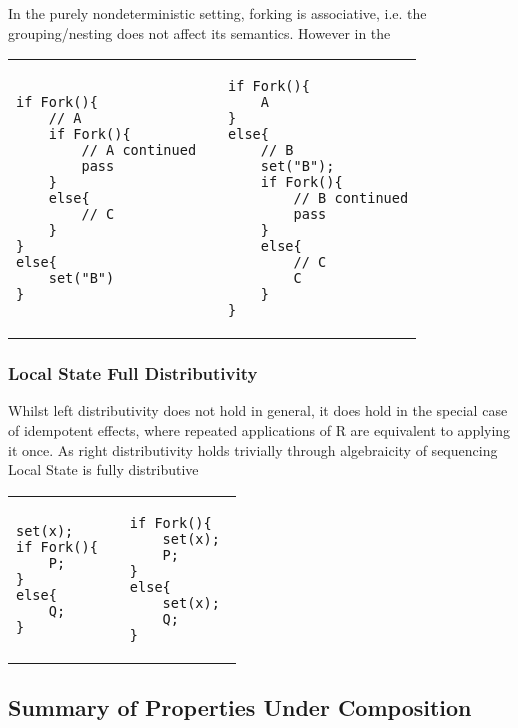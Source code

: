 \documentclass[logo,bsc,singlespacing,parskip]{infthesis}
\begin{document}
In the purely nondeterministic setting, forking is associative, i.e. the grouping/nesting does not affect its semantics. However in the 

\begin{table}[H]
\centering
\begin{tabular}{p{} c p{}}
\begin{lstlisting}
if Fork(){
    // A
    if Fork(){
        // A continued
        pass
    }
    else{
        // C
    }
}
else{
    set("B")
}
\end{lstlisting}
&
&
\begin{lstlisting}
if Fork(){
    A
} 
else{
    // B
    set("B");
    if Fork(){
        // B continued
        pass
    }
    else{
        // C
        C
    }
}
\end{lstlisting}
\end{tabular}
\end{table}
\vspace{-2em}


\subsubsection*{Local State Full Distributivity}
Whilst left distributivity does not hold in general, it does hold in the special case of idempotent effects, where repeated applications of R are equivalent to applying it once. As right distributivity holds trivially through algebraicity of sequencing Local State is fully distributive 

\vspace{-2em}
\begin{table}[H]
\centering
\begin{tabular}{p{} c p{}}
\begin{lstlisting}
set(x);
if Fork(){
    P;
}
else{
    Q;
}
\end{lstlisting}
&
&
\begin{lstlisting}
if Fork(){
    set(x); 
    P;
}
else{ 
    set(x); 
    Q;
}
\end{lstlisting}
\end{tabular}
\end{table}
\vspace{-2em}


\subsection{Summary of Properties Under Composition}
\end{document}
